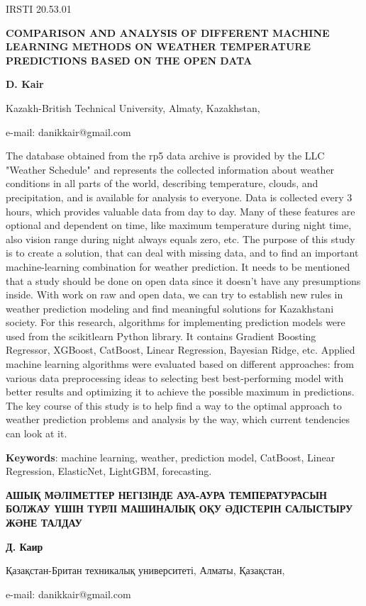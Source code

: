 IRSTI 20.53.01

{\bfseries COMPARISON AND ANALYSIS OF DIFFERENT MACHINE LEARNING METHODS ON
WEATHER TEMPERATURE PREDICTIONS BASED ON THE OPEN DATA}

{\bfseries D. Kair}

Kazakh-British Technical University, Almaty, Kazakhstan,

e-mail: danikkair@gmail.com

The database obtained from the rp5 data archive is provided by the LLC
"Weather Schedule" and represents the collected information about
weather conditions in all parts of the world, describing temperature,
clouds, and precipitation, and is available for analysis to everyone.
Data is collected every 3 hours, which provides valuable data from day
to day. Many of these features are optional and dependent on time, like
maximum temperature during night time, also vision range during night
always equals zero, etc. The purpose of this study is to create a
solution, that can deal with missing data, and to find an important
machine-learning combination for weather prediction. It needs to be
mentioned that a study should be done on open data since it doesn't have
any presumptions inside. With work on raw and open data, we can try to
establish new rules in weather prediction modeling and find meaningful
solutions for Kazakhstani society. For this research, algorithms for
implementing prediction models were used from the scikitlearn Python
library. It contains Gradient Boosting Regressor, XGBoost, CatBoost,
Linear Regression, Bayesian Ridge, etc. Applied machine learning
algorithms were evaluated based on different approaches: from various
data preprocessing ideas to selecting best best-performing model with
better results and optimizing it to achieve the possible maximum in
predictions. The key course of this study is to help find a way to the
optimal approach to weather prediction problems and analysis by the way,
which current tendencies can look at it.

{\bfseries Keywords}: machine learning, weather, prediction model,
CatBoost, Linear Regression, ElasticNet, LightGBM, forecasting.

{\bfseries АШЫҚ МӘЛІМЕТТЕР НЕГІЗІНДЕ АУА-АУРА ТЕМПЕРАТУРАСЫН БОЛЖАУ ҮШІН
ТҮРЛІ МАШИНАЛЫҚ ОҚУ ӘДІСТЕРІН САЛЫСТЫРУ ЖӘНЕ ТАЛДАУ}

{\bfseries Д. Каир}

Қазақстан-Британ техникалық университеті, Алматы, Қазақстан,

e-mail: danikkair@gmail.com

